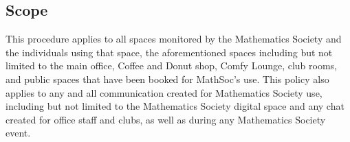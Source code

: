 \subsection{Scope}
This procedure applies to all spaces monitored by the Mathematics Society and the individuals using that space, the aforementioned spaces including but not limited to the main office, Coffee and Donut shop, Comfy Lounge, club rooms, and public spaces that have been booked for MathSoc's use. This policy also applies to any and all communication created for Mathematics Society use, including but not limited to the Mathematics Society digital space and any chat created for office staff and clubs, as well as during any Mathematics Society event.
